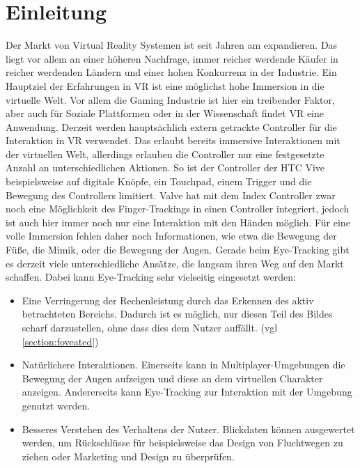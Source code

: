 \chapter{Einleitung}
Der Markt von Virtual Reality Systemen ist seit Jahren am expandieren. Das liegt vor allem an einer höheren Nachfrage, immer reicher werdende Käufer in reicher werdenden Ländern und einer hohen Konkurrenz in der Industrie\cite{grandview.2020}. Ein Hauptziel der Erfahrungen in VR ist eine möglichst hohe Immersion in die virtuelle Welt. Vor allem die Gaming Industrie ist hier ein treibender Faktor, aber auch für Soziale Plattformen oder in der Wissenschaft findet VR eine Anwendung. Derzeit werden hauptsächlich extern getrackte Controller für die Interaktion in VR verwendet. Das erlaubt bereits immersive Interaktionen mit der virtuellen Welt, allerdings erlauben die Controller nur eine festgesetzte Anzahl an unterschiedlichen Aktionen. So ist der Controller der HTC Vive beispielsweise auf digitale Knöpfe, ein Touchpad, einem Trigger und die Bewegung des Controllers limitiert. Valve hat mit dem Index Controller zwar noch eine Möglichkeit des Finger-Trackings in einen Controller integriert, jedoch ist auch hier immer noch nur eine Interaktion mit den Händen möglich. Für eine volle Immersion fehlen daher noch Informationen, wie etwa die Bewegung der Füße, die Mimik, oder die Bewegung der Augen. Gerade beim Eye-Tracking gibt es derzeit viele unterschiedliche Ansätze, die langsam ihren Weg auf den Markt schaffen. Dabei kann Eye-Tracking sehr vielseitig eingesetzt werden:
\begin{itemize}
	\item Eine Verringerung der Rechenleistung durch das Erkennen des aktiv betrachteten Bereichs. Dadurch ist es möglich, nur diesen Teil des Bildes scharf darzustellen, ohne dass dies dem Nutzer auffällt\cite{Rogers.2019}. (vgl \autoref{section:foveated})
	\item Natürlichere Interaktionen. Einerseits kann in Multiplayer-Umgebungen die Bewegung der Augen aufzeigen und diese an dem virtuellen Charakter anzeigen. Andererseits kann Eye-Tracking zur Interaktion mit der Umgebung genutzt werden\cite{Rogers.2019}. 
	\item Besseres Verstehen des Verhaltens der Nutzer. Blickdaten können ausgewertet werden, um Rückschlüsse für beispielsweise das Design von Fluchtwegen zu ziehen oder Marketing und Design zu überprüfen\cite{Rogers.2019}. 
\end{itemize}
